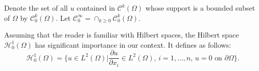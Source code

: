 Denote the set of all $u$ contained in $\mathscr{C}^{k}(\Omega)$ whose support is a bounded subset of $\Omega$ by $\mathscr{C}_{0}^{k}(\Omega)$. Let $\mathscr{C}_{0}^{\infty} = \cap_{k \geq 0} \mathscr{C}_{0}^{k}(\Omega)$.
\begin{remark}
	Assuming that the reader is familiar with Hilbert spaces, the Hilbert space $\mathscr{H}_{0}^{1}(\Omega)$ has significant importance in our context. It defines as follows:
	\begin{equation*}
	\mathscr{H}_{0}^{1}(\Omega) = \biggl\{ u\in L^2(\Omega) \vert \frac{\partial u}{\partial x_i} \in L^2(\Omega)\text{, } i=1,\dots,n\text{, } u=0 \text{ on } \partial\Omega \biggr\}.
	\end{equation*}
\end{remark}
